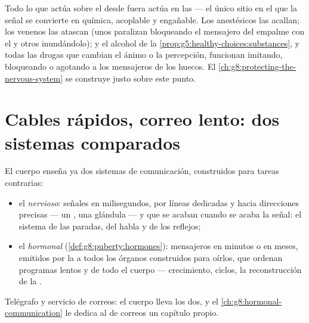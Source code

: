 \begin{remark}\label{rem:g8:nervous-communication:vulnerable}
Todo lo que actúa sobre el  desde fuera actúa en las
 --- el único sitio en el que la señal se convierte en química,
acoplable y engañable. Los anestésicos las acallan; los venenos las
atascan (unos paralizan bloqueando el mensajero del empalme con el
 y otros inundándolo); y el alcohol de la
\cref{prop:g5:healthy-choices:substances}, y todas las drogas que
cambian el ánimo o la percepción, funcionan imitando, bloqueando o
agotando a los mensajeros de los huecos. El
\cref{ch:g8:protecting-the-nervous-system} se construye justo sobre
este punto.
\end{remark}

\section{Cables rápidos, correo lento: dos sistemas comparados}

\begin{proposition}\label{prop:g8:nervous-communication:compare}
El cuerpo enseña ya dos sistemas de comunicación, construidos para
tareas contrarias:
\begin{itemize}
  \item el \emph{nervioso}: señales en milisegundos, por líneas
        dedicadas y hacia direcciones precisas --- un , una
        glándula --- y que se acaban cuando se acaba la señal: el
        sistema de las paradas, del habla y de los reflejos;
  \item el \emph{hormonal} (\cref{def:g8:puberty:hormones}):
        mensajeros en minutos o en meses, emitidos por la  a
        todos los órganos construidos para oírlos, que ordenan
        programas lentos y de todo el cuerpo --- crecimiento, ciclos,
        la reconstrucción de la .
\end{itemize}
Telégrafo y servicio de correos: el cuerpo lleva los dos, y el
\cref{ch:g8:hormonal-communication} le dedica al de correos un capítulo
propio.
\end{proposition}
\admitted

